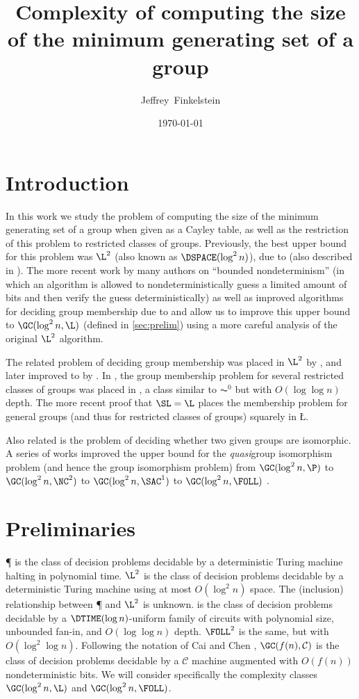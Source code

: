 \documentclass{article}
\title{Complexity of computing the size of the minimum generating set of a group}
\author{Jef{}frey~Finkelstein}
\date{\today}
\begin{document}
\maketitle

\section{Introduction}

In this work we study the problem of computing the size of the minimum generating set of a group when given as a Cayley table, as well as the restriction of this problem to restricted classes of groups.
Previously, the best upper bound for this problem was $\L^2$ (also known as $\DSPACE(\log^2 n)$), due to \cite{lsz77} (also described in \cite[Proposition~3]{at06}).
The more recent work by many authors on ``bounded nondeterminism'' (in which an algorithm is allowed to nondeterministically guess a limited amount of bits and then verify the guess deterministically) as well as improved algorithms for deciding group membership due to \cite{bm89} and \cite{bklm01} allow us to improve this upper bound to $\GC(\log^2 n, \L)$ (defined in \autoref{sec:prelim}) using a more careful analysis of the original $\L^2$ algorithm.

The related problem of deciding group membership was placed in $\L^2$ by \cite{lsz77}, and later improved to \SL{} by \cite{bm89}.
In \cite{bklm01}, the group membership problem for several restricted classes of groups was placed in \FOLL, a class similar to $\AC^0$ but with $O(\log \log n)$ depth.
The more recent proof that $\SL = \L$ \cite{reingold08} places the membership problem for general groups (and thus for restricted classes of groups) squarely in \L.

Also related is the problem of deciding whether two given groups are isomorphic.
A series of works improved the upper bound for the \emph{quasi}group isomorphism problem (and hence the group isomorphism problem) from $\GC(\log^2 n, \P)$ \cite{py96} to $\GC(\log^2 n, \NC^2)$ \cite{wolf94} to $\GC(\log^2 n, \SAC^1)$ \cite{wagner10} to $\GC(\log^2 n, \FOLL)$ \cite{ctw10}.

\section{Preliminaries}\label{sec:prelim}

\P{} is the class of decision problems decidable by a deterministic Turing machine halting in polynomial time.
$\L^2$ is the class of decision problems decidable by a deterministic Turing machine using at most $O(\log^2 n)$ space.
The (inclusion) relationship between \P{} and $\L^2$ is unknown.
\FOLL{} is the class of decision problems decidable by a $\DTIME(\log n)$-uniform family of circuits with polynomial size, unbounded fan-in, and $O(\log \log n)$ depth.
$\FOLL^2$ is the same, but with $O(\log^2 \log n)$.
Following the notation of Cai and Chen \cite{cc97}, $\GC(f(n), \mathcal{C})$ is the class of decision problems decidable by a $\mathcal{C}$ machine augmented with $O(f(n))$ nondeterministic bits.
We will consider specifically the complexity classes $\GC(\log^2 n, \L)$ and $\GC(\log^2 n, \FOLL)$.
\end{document}
